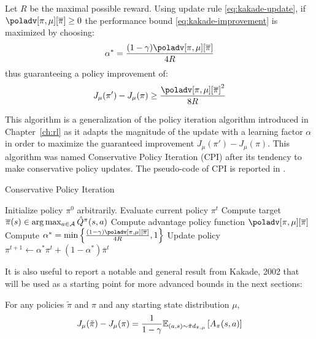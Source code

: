 \begin{theorem}
Let $R$ be the maximal possible reward. Using update rule \ref{eq:kakade-update}, if $\poladv[\pi, \mu][\overline{\pi}] \geq 0$ the performance bound \ref{eq:kakade-improvement} is maximized by choosing:
\begin{equation}
\alpha^* = \frac{(1-\gamma)\poladv[\pi, \mu][\overline{\pi}]}{4R}
\end{equation}
thus guaranteeing a policy improvement of:
\begin{equation}
J_{\mu}(\pi') - J_{\mu}(\pi) \geq \frac{{\poladv[\pi, \mu][\overline{\pi}]}^2}{8R}
\end{equation}
\end{theorem}

This algorithm is a generalization of the policy iteration algorithm introduced in Chapter~\ref{ch:rl} as it adapts the magnitude of the update with a learning factor $\alpha$ in order to maximize the guaranteed improvement $J_\mu(\pi') - J_\mu(\pi)$. This algorithm was named Conservative Policy Iteration (CPI) after its tendency to make conservative policy updates. The pseudo-code of CPI is reported in . 

\begin{algorithm}[t]
\caption{Conservative Policy Iteration}\label{alg:kakade}
\begin{algorithmic}
\State Initialize policy $\pi^0$ arbitrarily.
\State Evaluate current policy $\pi^t$
\State Compute target $\overline{\pi}(s)\in\arg\max_{a\in\aspace}{\hat{Q}^\pi (s,a)}$
\State Compute advantage policy function $\poladv[\pi,\mu][\overline{\pi}]$
\State Compute $\alpha^* = \min\left\{ \frac{(1-\gamma)\poladv[\pi, \mu][\overline{\pi}]}{4R}, 1 \right\}$
\State Update policy $\pi^{t+1} \gets \alpha^* \pi^t + (1 - \alpha^*)\overline{\pi}^t$
\EndFor
\end{algorithmic}
\end{algorithm}

It is also useful to report a notable and general result from Kakade, 2002 that will be used as a starting point for more advanced bounds in the next sections: 
\begin{theorem}\label{th:kakade-lemma6.1}
For any policies $\tilde{\pi}$ and $\pi$ and any starting state distribution $\mu$,
\begin{equation}
J_{\mu}(\tilde{\pi}) - J_{\mu}(\pi) = \frac{1}{1-\gamma}\EV[(a,s)\sim\tilde{\pi}d_{\tilde{\pi}, \mu}]{A_{\pi}(s,a)} 
\end{equation} 
\end{theorem}

